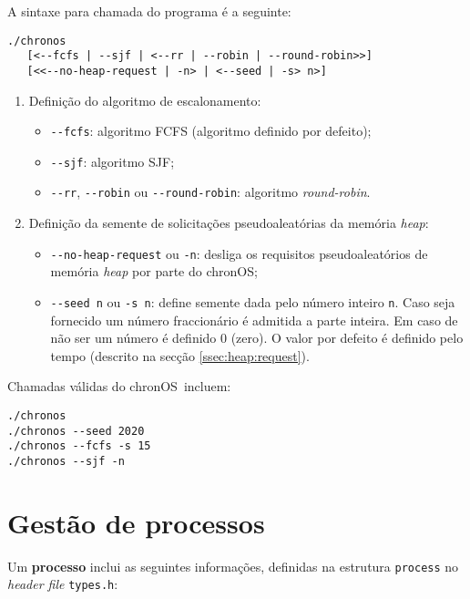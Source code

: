 \documentclass[10pt,oneside]{estiloUBI}
\newcommand{\chronOS}{\textsf{chronOS}}
\begin{document}
	A sintaxe para chamada do programa é a seguinte:
	
	\begin{verbatim}
./chronos
   [<--fcfs | --sjf | <--rr | --robin | --round-robin>>]
   [<<--no-heap-request | -n> | <--seed | -s> n>]
	\end{verbatim}
	
	\begin{enumerate}
		\item Definição do algoritmo de escalonamento:
		\begin{itemize}
			\item \verb|--fcfs|: algoritmo \ac{FCFS} (algoritmo definido por defeito);
			\item \verb|--sjf|: algoritmo \ac{SJF};
			\item \verb|--rr|, \verb|--robin| ou \verb|--round-robin|: algoritmo \textit{round-robin}. 
		\end{itemize}
	
		\item Definição da semente de solicitações pseudoaleatórias da memória \textit{heap}:
		\begin{itemize}
			\item \verb|--no-heap-request| ou \verb|-n|: desliga os requisitos pseudoaleatórios de memória \textit{heap} por parte do \chronOS;
			\item \verb|--seed n| ou \verb|-s n|: define semente dada pelo número inteiro \verb|n|. Caso seja fornecido um número fraccionário é admitida a parte inteira. Em caso de não ser um número é definido 0 (zero). O valor por defeito é definido pelo tempo (descrito na secção \ref{ssec:heap:request}).
		\end{itemize}
	\end{enumerate}
	
	Chamadas válidas do \chronOS~incluem:
	
	\begin{verbatim}
./chronos
./chronos --seed 2020
./chronos --fcfs -s 15
./chronos --sjf -n
	\end{verbatim}
	
	
	
	\chapter{Gestão de processos}
	\label{sec:process}
	
	Um \textbf{processo} inclui as seguintes informações, definidas na estrutura \verb|process| no \textit{header file} \texttt{types.h}:
	
\end{document}

